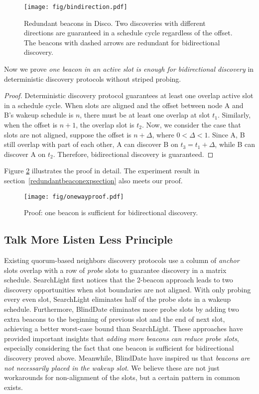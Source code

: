 \documentclass[conference]{IEEEtran}
\begin{document}
\begin{figure}[t]
    \centering
    \texttt{[image: fig/bindirection.pdf]}
    \caption{Redundant beacons in Disco. Two discoveries with different directions are guaranteed in a schedule cycle regardless of the offset.
    The beacons with dashed arrows are redundant for bidirectional discovery.}\label{redundantbeacon}
\end{figure}

Now we prove \emph{one beacon in an active slot is enough for bidirectional discovery} in deterministic discovery protocols without striped probing.
\begin{proof}
Deterministic discovery protocol guarantees at least one overlap active slot in a schedule cycle.
When slots are aligned and the offset between node A and B's wakeup schedule is $n$, there must be at least one overlap at slot $t_1$.
Similarly, when the offset is $n+1$, the overlap slot is $t_2$.
Now, we consider the case that slots are not aligned, suppose the offset is $n+\Delta$, where $0 < \Delta < 1 $.
Since A, B still overlap with part of each other, A can discover B on $t_3=t_1+\Delta$, while B can discover A on $t_2$. Therefore, bidirectional discovery is guaranteed.
\end{proof}
Figure \ref{redundantbeaconproof} illustrates the proof in detail. The experiment result in section~\ref{redundantbeaconexpsection} also meets our proof.

\begin{figure}[t]
    \centering
    \texttt{[image: fig/onewayproof.pdf]}
    \caption{Proof: one beacon is sufficient for bidirectional discovery.}\label{redundantbeaconproof}
\end{figure}

\subsection{Talk More Listen Less Principle}
Existing quorum-based neighbors discovery protocols use a column of \emph{anchor} slots overlap with a row of \emph{probe} slots to guarantee discovery in a matrix schedule.
SearchLight first notices that the 2-beacon approach leads to two discovery opportunities when slot boundaries are not aligned.
With only probing every even slot, SearchLight eliminates half of the probe slots in a wakeup schedule.
Furthermore, BlindDate eliminates more probe slots by adding two extra beacons to the beginning of previous slot and the end of next slot, 
achieving a better worst-case bound than SearchLight.
These approaches have provided important insights that \emph{adding more beacons can reduce probe slots},
especially considering the fact that one beacon is sufficient for bidirectional discovery proved above.
Meanwhile, BlindDate have inspired us that \emph{beacons are not necessarily placed in the wakeup slot}.
We believe these are not just workarounds for non-alignment of the slots, but a certain pattern in common exists.
\end{document}
